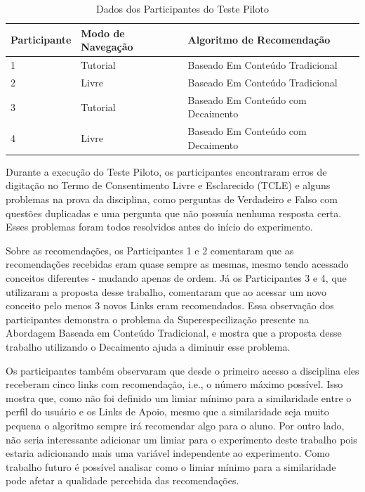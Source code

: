 \begin{table}[h]
\footnotesize
\caption[Dados dos Participantes do Teste Piloto]{Dados dos Participantes do Teste Piloto}
\label{tab:participantes-teste-piloto}
\centering
\begin{tabular}{|p{2cm}|p{3.5cm}|p{6.5cm}|}
  \hline
  \textbf{Participante} & \textbf{Modo de Navegação} & \textbf{Algoritmo de Recomendação} \\
  \hline
  1 & Tutorial & Baseado Em Conteúdo Tradicional \\
  \hline
  2 & Livre & Baseado Em Conteúdo Tradicional \\
  \hline
  3 & Tutorial & Baseado Em Conteúdo com Decaimento \\
  \hline
  4 & Livre & Baseado Em Conteúdo com Decaimento \\
  \hline
\end{tabular}
\end{table}

Durante a execução do Teste Piloto, os participantes encontraram erros de digitação no Termo de Consentimento Livre e Esclarecido (TCLE)
e alguns problemas na prova da disciplina, como perguntas de Verdadeiro e Falso com questões duplicadas e uma
pergunta que não possuía nenhuma resposta certa. Esses problemas foram todos resolvidos antes do início do experimento.

Sobre as recomendações, os Participantes 1 e 2 comentaram que as recomendações recebidas eram quase sempre as mesmas,
mesmo tendo acessado conceitos diferentes - mudando apenas de ordem. Já os Participantes
3 e 4, que utilizaram a proposta desse trabalho, comentaram que ao acessar um novo conceito pelo menos 3 novos Links eram
recomendados. Essa observação dos participantes demonstra o problema da Superespecilização presente na Abordagem Baseada
em Conteúdo Tradicional, e mostra que a proposta desse trabalho utilizando o Decaimento ajuda a diminuir esse problema.

Os participantes também observaram que desde o primeiro acesso a disciplina eles receberam cinco links com recomendação, i.e.,
o número máximo possível. Isso mostra que, como não foi definido um limiar mínimo para a similaridade entre o perfil do usuário
e os Links de Apoio, mesmo que a similaridade seja muito pequena o algoritmo sempre irá recomendar algo para o aluno. Por
outro lado, não seria interessante adicionar um limiar para o experimento deste trabalho pois estaria adicionando
mais uma variável independente ao experimento. Como trabalho futuro é possível analisar como o limiar mínimo para a
similaridade pode afetar a qualidade percebida das recomendações.

